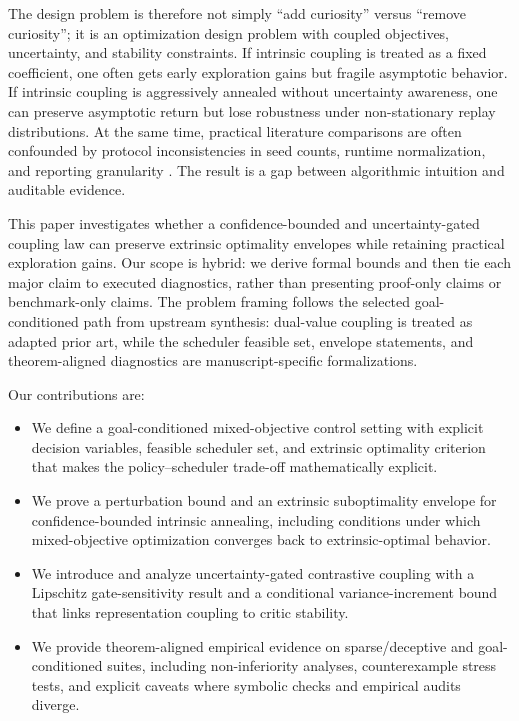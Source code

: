 \documentclass{article} %
\begin{document}
The design problem is therefore not simply ``add curiosity'' versus ``remove curiosity''; it is an optimization design problem with coupled objectives, uncertainty, and stability constraints. If intrinsic coupling is treated as a fixed coefficient, one often gets early exploration gains but fragile asymptotic behavior. If intrinsic coupling is aggressively annealed without uncertainty awareness, one can preserve asymptotic return but lose robustness under non-stationary replay distributions. At the same time, practical literature comparisons are often confounded by protocol inconsistencies in seed counts, runtime normalization, and reporting granularity \citep{arxiv1912_01588, arxiv2004_07219, arxiv2405_19548}. The result is a gap between algorithmic intuition and auditable evidence.

This paper investigates whether a confidence-bounded and uncertainty-gated coupling law can preserve extrinsic optimality envelopes while retaining practical exploration gains. Our scope is hybrid: we derive formal bounds and then tie each major claim to executed diagnostics, rather than presenting proof-only claims or benchmark-only claims. The problem framing follows the selected goal-conditioned path from upstream synthesis: dual-value coupling is treated as adapted prior art, while the scheduler feasible set, envelope statements, and theorem-aligned diagnostics are manuscript-specific formalizations.

Our contributions are:
\begin{itemize}
  \item We define a goal-conditioned mixed-objective control setting with explicit decision variables, feasible scheduler set, and extrinsic optimality criterion that makes the policy--scheduler trade-off mathematically explicit.
  \item We prove a perturbation bound and an extrinsic suboptimality envelope for confidence-bounded intrinsic annealing, including conditions under which mixed-objective optimization converges back to extrinsic-optimal behavior.
  \item We introduce and analyze uncertainty-gated contrastive coupling with a Lipschitz gate-sensitivity result and a conditional variance-increment bound that links representation coupling to critic stability.
  \item We provide theorem-aligned empirical evidence on sparse/deceptive and goal-conditioned suites, including non-inferiority analyses, counterexample stress tests, and explicit caveats where symbolic checks and empirical audits diverge.
\end{itemize}
\end{document}

